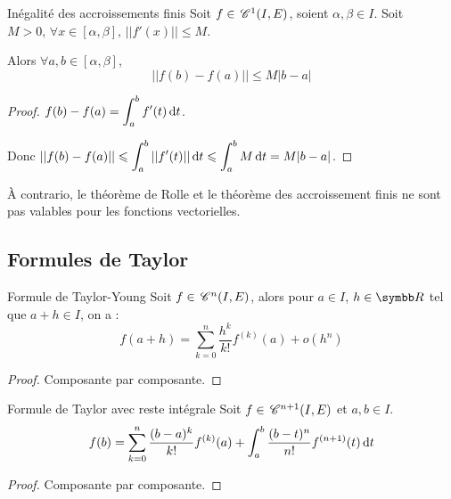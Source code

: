 \begin{theoreme}{Inégalité des accroissements finis}{}
    Soit $f \in \,\mathscr C^{1}(I, E)$, soient $\alpha,\beta \in I$. Soit $M > 0, \, \forall x \in [\alpha,\beta], \, ||f'(x)|| \leqslant M$.

    Alors $\forall a, b \in [\alpha,\beta]$, 
    \[||f(b) - f(a)|| \leqslant M |b - a|\]
\end{theoreme}


\begin{proof}
    $\displaystyle f(b) - f(a) = \int_a^b f'(t) \,\mathrm{d}t$.

    Donc $\displaystyle ||f(b) - f(a)|| \leqslant \int_a^b ||f'(t)|| \,\mathrm{d}t \leqslant \int_a^b M \,\mathrm{d}t = M |b - a|$.
\end{proof}

\begin{remarque}
    À contrario, le théorème de Rolle et le théorème des accroissement finis ne sont pas valables pour les fonctions vectorielles.
\end{remarque}

\subsection{Formules de Taylor}


\begin{proposition}{Formule de Taylor-Young}{}
    Soit $f \in \,\mathscr C^{n}(I, E)$, alors pour $a \in I$, $h \in \R$ tel que $a + h \in I$, on a :
    \[f(a + h) = \sum_{k = 0 }^{n } \frac{h^k}{k!} f^{(k)}(a) + o(h^n)\]
\end{proposition}

\begin{proof}
    Composante par composante.
\end{proof}

\begin{proposition}{Formule de Taylor avec reste intégrale}{}
    Soit $f \in \,\mathscr C^{n + 1}(I, E)$ et $a, b \in I$. 
    \[f(b) = \sum_{k = 0 }^{n } \frac{(b - a)^k}{k!} f^{(k)}(a) + \int_a^b \frac{(b - t)^n}{n!} f^{(n+1)}(t) \,\mathrm{d}t\]
\end{proposition}

\begin{proof}
    Composante par composante.
\end{proof}

